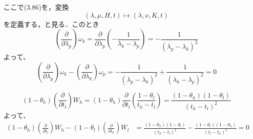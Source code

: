 \begin{story}
ここで(3.86)を，変換
\begin{equation}
    (\lambda, \mu, H, t) \mapsto (\lambda, \nu, K, t) \label{eq:3.87}
\end{equation}
を定義する，と見る．このとき
\begin{equation*}
    \left(\frac{\partial}{\partial \lambda_p}\right)\omega_k = \frac{\partial}{\partial \lambda_p}\left( -\frac{1}{\lambda_k-\lambda_p} \right) = -\frac{1}{(\lambda_p-\lambda_k)^2}
\end{equation*}
よって、
\begin{equation*}
    \left(\frac{\partial}{\partial \lambda_p}\right)\omega_k - \left(\frac{\partial}{\partial \lambda_k}\right)\omega_p = -\frac{1}{(\lambda_p-\lambda_k)^2} + \frac{1}{(\lambda_k-\lambda_p)^2} = 0
\end{equation*}


\begin{equation*}
    (1-\theta_h)\left(\frac{\partial}{\partial t_l}\right)W_h = (1-\theta_h)\frac{\partial}{\partial t_l}\left( \frac{1-\theta_l}{t_h-t_l} \right) = \frac{(1-\theta_h)(1-\theta_l)}{(t_h-t_l)^2}
\end{equation*}
よって、
\begin{align*}
    (1-\theta_h)\left(\frac{\partial}{\partial t_l}\right)W_h - (1-\theta_l)\left(\frac{\partial}{\partial t_h}\right)W_l &= \frac{(1-\theta_h)(1-\theta_l)}{(t_h-t_l)^2} - \frac{(1-\theta_l)(1-\theta_h)}{(t_l-t_h)^2} = 0
\end{align*}



\end{story}

